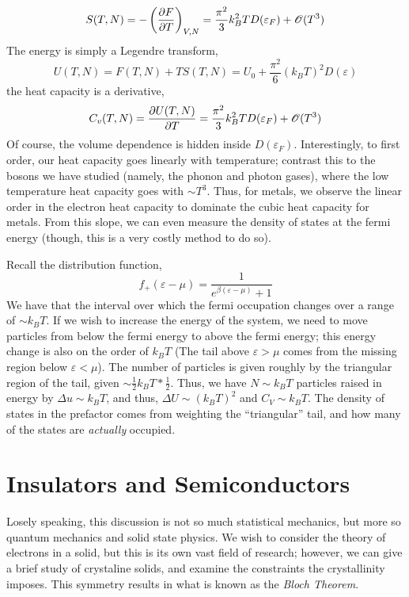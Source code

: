 \[S(T,N) = -\left(\frac{\partial F}{\partial T}\right)_{V,N} = \frac{\pi^2}{3}k_B^2T D(\varepsilon_F) + \mathscr{O}(T^3)\]
The energy is simply a Legendre transform,
\[U(T,N) = F(T,N)+TS(T,N) = U_0+\frac{\pi^2}{6}(k_BT)^2D(\varepsilon)\]
the heat capacity is a derivative,
\[C_v(T,N) = \frac{\partial U(T,N)}{\partial T} = \frac{\pi^2}{3}k_B^2TD(\varepsilon_F) + \mathscr{O}(T^3)\]
Of course, the volume dependence is hidden inside \(D(\varepsilon_F)\). Interestingly, to first order, our heat capacity goes linearly with temperature; contrast this to the bosons we have studied (namely, the phonon and photon gases), where the low temperature heat capacity goes with \(\sim T^3\). Thus, for metals, we observe the linear order in the electron heat capacity to dominate the cubic heat capacity for metals. From this slope, we can even measure the density of states at the fermi energy (though, this is a very costly method to do so).

\begin{aside}
Recall the distribution function, 
\[f_+(\varepsilon-\mu) = \frac{1}{e^{\beta(\varepsilon-\mu)}+1}\]
We have that the interval over which the fermi occupation changes over a range of \(\sim k_BT\). If we wish to increase the energy of the system, we need to move particles from below the fermi energy to above the fermi energy; this energy change is also on the order of \(k_BT\) (The tail above \(\varepsilon>\mu\) comes from the missing region below \(\varepsilon<\mu\)). The number of particles is given roughly by the triangular region of the tail, given \(\sim\frac{1}{2}k_BT*\frac{1}{2}\). Thus, we have \(N\sim k_BT\) particles raised in energy by \(\Delta u \sim k_BT\), and thus, \(\Delta U\sim (k_BT)^2\) and \(C_V\sim k_BT\). The density of states in the prefactor comes from weighting the ``triangular'' tail, and how many of the states are \emph{actually} occupied.
\end{aside}

\chapter{Insulators and Semiconductors}
Losely speaking, this discussion is not so much statistical mechanics, but more so quantum mechanics and solid state physics. We wish to consider the theory of electrons in a solid, but this is its own vast field of research; however, we can give a brief study of crystaline solids, and examine the constraints the crystallinity imposes. This symmetry results in what is known as the \emph{Bloch Theorem}.
